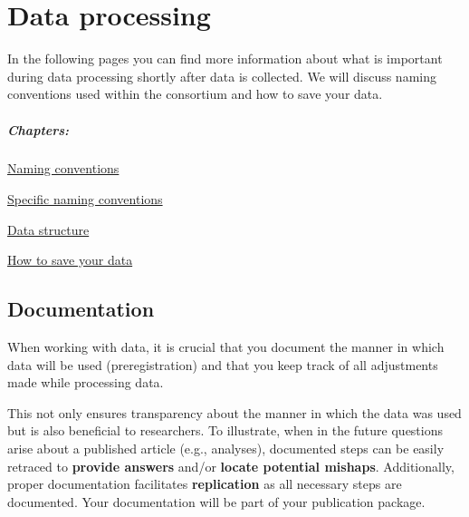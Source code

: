 \documentclass[
  letterpaper,
  DIV=11,
  numbers=noendperiod]{scrreprt}
\begin{document}
\part{Data processing}

In the following pages you can find more information about what is
important during data processing shortly after data is collected. We
will discuss naming conventions used within the consortium and how to
save your data.

\subsubsection*{Chapters:}\label{chapters-2}

\href{general-naming-conventions.qmd}{Naming conventions}

\href{specific-naming-conventions.qmd}{Specific naming conventions}

\href{data-structure.qmd}{Data structure}

\href{how-to-save-your-data.qmd}{How to save your data}

\chapter{Documentation}\label{documentation}

\label{mainbox}
When working with data, it is crucial that you document the manner in
which data will be used (preregistration) and that you keep track of all
adjustments made while processing data.

This not only ensures transparency about the manner in which the data
was used but is also beneficial to researchers. To illustrate, when in
the future questions arise about a published article (e.g., analyses),
documented steps can be easily retraced to \textbf{provide answers}
and/or \textbf{locate potential mishaps}. Additionally, proper
documentation facilitates \textbf{replication} as all necessary steps
are documented. Your documentation will be part of your publication
package.
\end{document}
